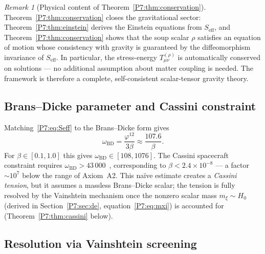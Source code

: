 \documentclass[11pt,a4paper]{article}
\theoremstyle{definition}
\theoremstyle{remark}
\newtheorem{remark}[theorem]{Remark}
\newcommand{\vp}{\varphi}
\newcommand{\oBD}{\omega_{\mathrm{BD}}}
\begin{document}
\begin{remark}[Physical content of Theorem~\ref{P7:thm:conservation}]
\label{P7:rem:conservation_physical_content}
Theorem~\ref{P7:thm:conservation} closes the gravitational sector:
Theorem~\ref{P7:thm:einstein} derives the Einstein equations from $S_{\mathrm{eff}}$,
and Theorem~\ref{P7:thm:conservation} shows that the soup scalar $\rho$ satisfies
an equation of motion whose consistency with gravity is guaranteed by the
diffeomorphism invariance of $S_{\mathrm{eff}}$.
In particular, the stress-energy $T_{\mu\nu}^{(\rho)}$ is automatically
conserved on solutions --- no additional assumption about matter coupling is needed.
The framework is therefore a complete, self-consistent scalar-tensor gravity theory.
\end{remark}

\subsection{Brans--Dicke parameter and Cassini constraint}
\label{P7:sec:cassini}

Matching~\eqref{P7:eq:Seff} to the Brans--Dicke form gives
\begin{equation}
  \oBD = \frac{\vp^{12}}{3\beta}
  \approx \frac{107.6}{\beta}.
  \label{P7:eq:oBD}
\end{equation}
For $\beta\in[0.1,1.0]$ this gives $\oBD\in[108,1076]$.
The Cassini spacecraft constraint requires $\oBD > 43\,000$~\cite{Cassini2003},
corresponding to $\beta < 2.4\times10^{-8}$ --- a factor $\sim10^7$ below the
range of Axiom~A2.  This na\"ive estimate creates a \emph{Cassini tension}, but
it assumes a massless Brans--Dicke scalar; the tension is fully resolved by
the Vainshtein mechanism once the nonzero scalar mass $m_\xi\sim H_0$
(derived in Section~\ref{P7:sec:de}, equation~\eqref{P7:eq:mxi}) is accounted for
(Theorem~\ref{P7:thm:cassini} below).

\subsection{Resolution via Vainshtein screening}
\label{P7:sec:vainshtein}
\end{document}
